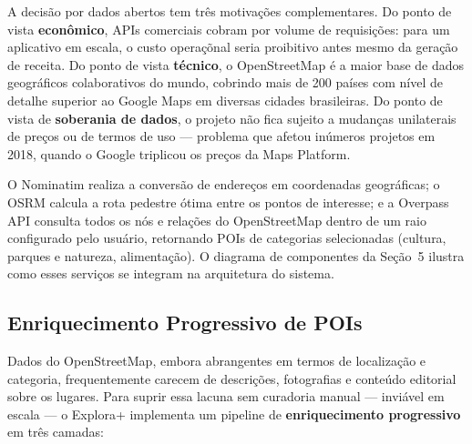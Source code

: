\documentclass[12pt, a4paper]{article}
\begin{document}
A decis\~ao por dados abertos tem tr\^es motiva\c{c}\~oes complementares. Do ponto de vista \textbf{econ\^omico}, APIs comerciais cobram por volume de requisi\c{c}\~oes: para um aplicativo em escala, o custo opera\c{c}\~onal seria proibitivo antes mesmo da gera\c{c}\~ao de receita. Do ponto de vista \textbf{t\'ecnico}, o OpenStreetMap \parencite{osm2024} \'e a maior base de dados geogr\'aficos colaborativos do mundo, cobrindo mais de 200 pa\'ises com n\'ivel de detalhe superior ao Google Maps em diversas cidades brasileiras. Do ponto de vista de \textbf{soberania de dados}, o projeto n\~ao fica sujeito a mudan\c{c}as unilaterais de pre\c{c}os ou de termos de uso --- problema que afetou in\'umeros projetos em 2018, quando o Google triplicou os pre\c{c}os da Maps Platform.

O Nominatim realiza a convers\~ao de endere\c{c}os em coordenadas geogr\'aficas; o OSRM calcula a rota pedestre \'otima entre os pontos de interesse; e a Overpass API consulta todos os n\'os e rela\c{c}\~oes do OpenStreetMap dentro de um raio configurado pelo usu\'ario, retornando POIs de categorias selecionadas (cultura, parques e natureza, alimenta\c{c}\~ao). O diagrama de componentes da Se\c{c}\~ao~5 ilustra como esses servi\c{c}os se integram na arquitetura do sistema.

\subsection{Enriquecimento Progressivo de POIs}

Dados do OpenStreetMap, embora abrangentes em termos de localiza\c{c}\~ao e categoria, frequentemente carecem de descri\c{c}\~oes, fotografias e conte\'udo editorial sobre os lugares. Para suprir essa lacuna sem curadoria manual --- invi\'avel em escala --- o Explora+ implementa um pipeline de \textbf{enriquecimento progressivo} em tr\^es camadas:
\end{document}

